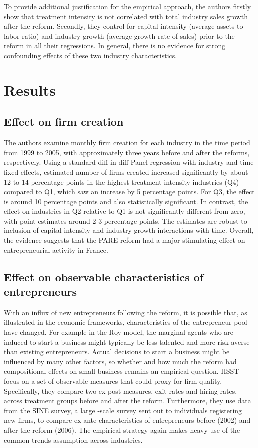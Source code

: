 To provide additional justification for the empirical approach, the authors firstly show that treatment intensity is not correlated with total industry sales growth after the reform. Secondly, they control for capital intensity (average assets-to-labor ratio) and industry growth (average growth rate of sales) prior to the reform in all their regressions. In general, there is no evidence for strong confounding effects of these two industry characteristics.


\section{Results}

\subsection{Effect on firm creation}

The authors examine monthly firm creation for each industry in the time period from 1999 to 2005, with approximately three years before and after the reforms, respectively. Using a standard diff-in-diff Panel regression with industry and time fixed effects, estimated number of firms created increased significantly by about 12 to 14 percentage points in the highest treatment intensity industries (Q4) compared to Q1, which saw an increase by 5 percentage points. For Q3, the effect is around 10 percentage points and also statistically significant. In contrast, the effect on industries in Q2 relative to Q1 is not significantly different from zero, with point estimates around 2-3 percentage points. The estimates are robust to inclusion of capital intensity and industry growth interactions with time. Overall, the evidence suggests that the PARE reform had a major stimulating effect on entrepreneurial activity in France.


\subsection{Effect on observable characteristics of entrepreneurs}

With an influx of new entrepreneurs following the reform, it is possible that, as illustrated in the economic frameworks, characteristics of the entrepreneur pool have changed. For example in the Roy model, the marginal agents who are induced to start a business might typically be less talented and more risk averse than existing entrepreneurs. Actual decisions to start a business might be influenced by many other factors, so whether and how much the reform had compositional effects on small business remains an empirical question. HSST focus on a set of observable measures that could proxy for firm quality. Specifically, they compare two ex post measures, exit rates and hiring rates, across treatment groups before and after the reform. Furthermore, they use data from the SINE survey, a large -scale survey sent out to individuals registering new firms, to compare ex ante characteristics of entrepreneurs before (2002) and after the reform (2006). The empirical strategy again makes heavy use of the common trends assumption across industries.

